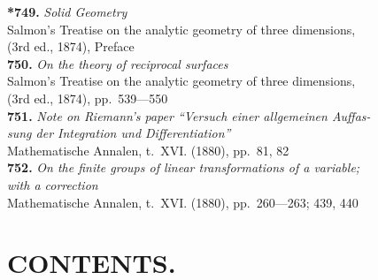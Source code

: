 \documentclass[12pt,a4paper,oneside]{book}
\theoremstyle{plain}
\theoremstyle{definition}
\theoremstyle{remark}
\begin{document}
\textbf{*749.} \textit{Solid Geometry} \\
\hspace*{2em}Salmon's Treatise on the analytic geometry of three dimensions,\\
\hspace*{2em}(3rd ed., 1874), Preface\\[0.3em]
\textbf{750.} \textit{On the theory of reciprocal surfaces} \\
\hspace*{2em}Salmon's Treatise on the analytic geometry of three dimensions,\\
\hspace*{2em}(3rd ed., 1874), pp.~539---550\\[0.3em]
\textbf{751.} \textit{Note on Riemann's paper ``Versuch einer allgemeinen Auffas-}\\
\hspace*{2em}\textit{sung der Integration und Differentiation''} \\
\hspace*{2em}Mathematische Annalen, t.~XVI. (1880), pp.~81, 82\\[0.3em]
\textbf{752.} \textit{On the finite groups of linear transformations of a variable;}\\
\hspace*{2em}\textit{with a correction} \\
\hspace*{2em}Mathematische Annalen, t.~XVI. (1880), pp.~260---263; 439, 440

\cleardoublepage

\chapter*{CONTENTS.}
\end{document}
